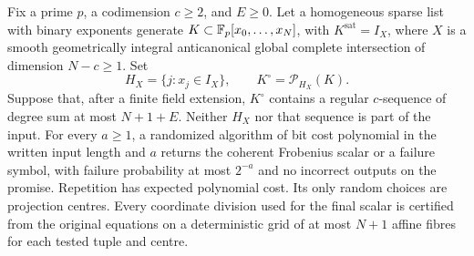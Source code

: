 \begin{theorem}
\label{sci:thm:certified-preprocessing}
Fix a prime $p$, a codimension $c\ge2$, and $E\ge0$. Let a homogeneous
sparse list with binary exponents generate
$K\subset\mathbb F_p[x_0,\ldots,x_N]$, with
$K^{\mathrm{sat}}=I_X$, where $X$ is a smooth geometrically integral
anticanonical global complete intersection of dimension $N-c\ge1$.
Set
\[
 H_X=\{j:x_j\in I_X\},\qquad K^\circ=\mathcal P_{H_X}(K).
\]
Suppose that, after a finite field extension, $K^\circ$ contains a
regular $c$-sequence of degree sum at most $N+1+E$. Neither $H_X$ nor
that sequence is part of the input. For every $a\ge1$, a randomized
algorithm of bit cost polynomial in the written input length and $a$
returns the coherent Frobenius scalar or a failure symbol, with failure
probability at most $2^{-a}$ and no incorrect outputs on the promise.
Repetition has expected polynomial cost. Its only random choices are
projection centres. Every coordinate division used for the final
scalar is certified from the original equations on a deterministic
grid of at most $N+1$ affine fibres for each tested tuple and centre.
\end{theorem}
